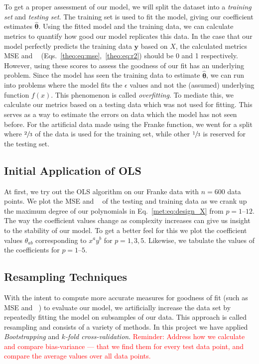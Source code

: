 \documentclass[twocolumn,english,notitlepage]{article}
\newcommand{\comment}[1]{\textcolor{red}{#1}}
\renewcommand{\vec}[1]{\boldsymbol{#1}}
\DeclareMathOperator{\Rsquared}{R^2}
\begin{document}
            To get a proper assessment of our model, we will split the dataset into a \textit{training set} and \textit{testing set}. The training set is used to fit the model, giving our coefficient estimates $\vec{\hat{\theta}}$. Using the fitted model and the training data, we can calculate metrics to quantify how good our model replicates this data. In the case that our model perfectly predicts the training data $\vec{y}$ based on $X$, the calculated metrics MSE and $\Rsquared$ (Eqs.~\ref{theo:eq:mse},~\ref{theo:eq:r2}) should be 0 and 1 respectively. However, using these scores to assess the goodness of our fit has an underlying problem. Since the model has seen the training data to estimate $\vec{\hat{\theta}}$, we can run into problems where the model fits the $\epsilon$ values and not the (assumed) underlying function $f(x)$. This phenomenon is called \textit{overfitting}. To mediate this, we calculate our metrics based on a testing data which was not used for fitting. This serves as a way to estimate the errors on data which the model has not seen before. For the artificial data made using the Franke function, we went for a split where $\sfrac{2}{3}$ of the data is used for the training set, while other $\sfrac{1}{3}$ is reserved for the testing set.


    \subsection{Initial Application of OLS}
        At first, we try out the OLS algorithm on our Franke data with $n=600$ data points. We plot the MSE and $\Rsquared$ of the testing and training data as we crank up the maximum degree of our polynomials in Eq.~\eqref{met:eq:design_X} from $p=1 \text{--} 12$. The way the coefficient values change as complexity increases can give us insight to the stability of our model. To get a better feel for this we plot the coefficient values $\theta_{ab}$ corresponding to $x^ay^b$ for $p=1,3,5$. Likewise, we tabulate the values of the coefficients for $p=1 \text{--} 5$. 

    \subsection{Resampling Techniques}
        With the intent to compute more accurate measures for goodness of fit (such as MSE and $\Rsquared$) to evaluate our model, we 
        artificially increase the data set by repeatedly fitting the model on subsamples of our data. This approach is called resampling and consists of a variety of methods. In this project we have applied \textit{Bootstrapping} and \textit{$k$-fold cross-validation}. 
        \comment{Reminder: Address how we calculate and compare bias-variance --- that we find them for every test data point, and compare the average values over all data points.}
\end{document}
